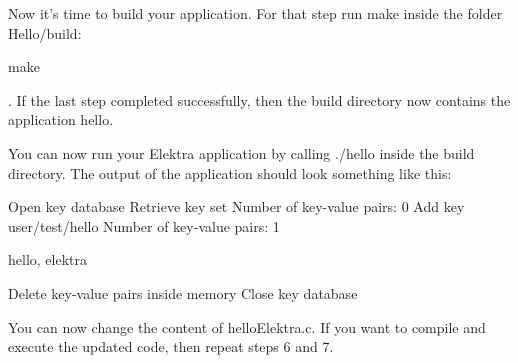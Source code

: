 \begin{DoxyEnumerate}
\item Now it’s time to build your application. For that step run {\ttfamily make} inside the folder {\ttfamily Hello/build}\+:
\end{DoxyEnumerate}


\begin{DoxyCode}
make
\end{DoxyCode}


. If the last step completed successfully, then the build directory now contains the application {\ttfamily hello}.


\begin{DoxyEnumerate}
\item You can now run your Elektra application by calling {\ttfamily ./hello} inside the build directory. The output of the application should look something like this\+:
\end{DoxyEnumerate}


\begin{DoxyCode}
Open key database
Retrieve key set
Number of key-value pairs: 0
Add key user/test/hello
Number of key-value pairs: 1

hello, elektra

Delete key-value pairs inside memory
Close key database
\end{DoxyCode}



\begin{DoxyEnumerate}
\item You can now change the content of {\ttfamily hello\+Elektra.\+c}. If you want to compile and execute the updated code, then repeat steps 6 and 7. 
\end{DoxyEnumerate}